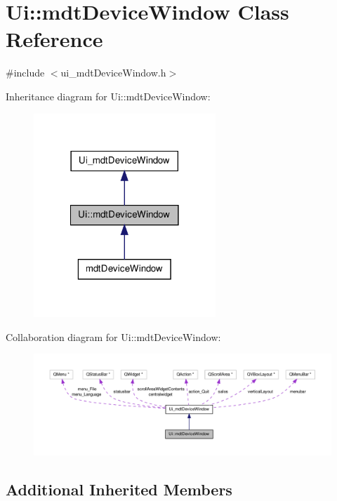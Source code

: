 \hypertarget{class_ui_1_1mdt_device_window}{\section{Ui\-:\-:mdt\-Device\-Window Class Reference}
\label{class_ui_1_1mdt_device_window}
}


{\ttfamily \#include $<$ui\-\_\-mdt\-Device\-Window.\-h$>$}



Inheritance diagram for Ui\-:\-:mdt\-Device\-Window\-:
\nopagebreak
\begin{figure}[H]
\begin{center}
\leavevmode
\includegraphics[width=194pt]{class_ui_1_1mdt_device_window__inherit__graph}
\end{center}
\end{figure}


Collaboration diagram for Ui\-:\-:mdt\-Device\-Window\-:
\nopagebreak
\begin{figure}[H]
\begin{center}
\leavevmode
\includegraphics[width=350pt]{class_ui_1_1mdt_device_window__coll__graph}
\end{center}
\end{figure}
\subsection*{Additional Inherited Members}


